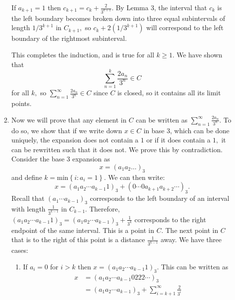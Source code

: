 \documentclass{article}
\numberwithin{equation}{section}
\begin{document}
\begin{enumerate}
\begin{enumerate}[label=Proof of (\arabic*)]
        If $a_{k+1}=1$ then $c_{k+1} = c_k + \frac{2}{3^{k+1}}.$ By Lemma 3, the interval that $c_k$ is the left boundary becomes broken down into three equal subintervals of length $1/3^{k+1}$ in $C_{k+1},$ so $c_k + 2\left(1/3^{k+1}\right)$ will correspond to the left boundary of the rightmost subinterval. 
        
        This completes the induction, and is true for all $k \ge 1.$ We have shown that
        \begin{equation}
            \sum_{n=1}^{k} \frac{2a_n}{3^n} \in C 
        \end{equation}
        for all $k,$ so $\sum_{n=1}^{\infty} \frac{2a_n}{3^n} \in C$ since $C$ is closed, so it contains all its limit points.

        \item Now we will prove that any element in $C$ can be written as $\sum_{n=1}^\infty \frac{2a_n}{3^n}.$ To do so, we show that if we write down $x\in C$ in base 3, which can be done uniquely, the expansion does not contain a $1$ or if it does contain a $1,$ it can be rewritten such that it does not. We prove this by contradiction. Consider the base 3 expansion as 
        \begin{equation}
            x = (a_1a_2\dots )_3
        \end{equation} 
        and define $k = \text{min}\left\{i:a_i = 1\right\}.$ We can then write:
        \begin{equation}
            x = (a_1a_2\cdots a_{k-1}1)_3  + (0\cdots 0a_{k+1}a_{k+2}\cdots)_3.
        \end{equation}
        Recall that $(a_1\cdots a_{k-1})_3$ corresponds to the left boundary of an interval with length $\frac{1}{3^{k-1}}$ in $C_{k-1}.$ Therefore, $(a_1a_2\cdots a_{k-1}1)_3 =  (a_1a_2\cdots a_{k-1})_3 + \frac{1}{3^k}$ corresponds to the right endpoint of the same interval. This is a point in $C.$ The next point in $C$ that is to the right of this point is a distance $\frac{1}{3^{k-1}}$ away. We have three cases:
        \begin{enumerate}[label=Case (\arabic*)]
            \item If $a_{i} = 0$ for $i > k$ then $x = (a_1a_2\cdots a_{k-1}1)_3.$ This can be written as
            \begin{align}
                x &= (a_1a_2\cdots a_{k-1}0222\cdots)_3 \\ 
                &= (a_1a_2\cdots a_{k-1})_3 + \sum_{i=k+1}^{\infty}\frac{2}{3^i} \\ 

\end{align}
\end{enumerate}
\end{enumerate}
\end{enumerate}
\end{document}
